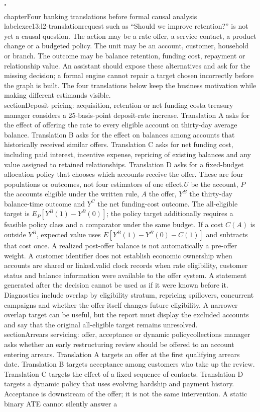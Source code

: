 "\\chapter{Four banking translations before formal causal analysis}\n\\label{exec13:l2-translation}\n\nA request such as “Should we improve retention?” is not yet a causal question. The action may be a rate offer, a service contact, a product change or a budgeted policy. The unit may be an account, customer, household or branch. The outcome may be balance retention, funding cost, repayment or relationship value. An assistant should expose these alternatives and ask for the missing decision; a formal engine cannot repair a target chosen incorrectly before the graph is built. The four translations below keep the business motivation while making different estimands visible.\n\n\\section{Deposit pricing: acquisition, retention or net funding cost}\n\nSuppose a treasury manager considers a 25-basis-point deposit-rate increase. Translation A asks for the effect of offering the rate to every eligible account on thirty-day average balance. Translation B asks for the effect on balances among accounts that historically received similar offers. Translation C asks for net funding cost, including paid interest, incentive expense, repricing of existing balances and any value assigned to retained relationships. Translation D asks for a fixed-budget allocation policy that chooses which accounts receive the offer. These are four populations or outcomes, not four estimators of one effect.\n\nLet $U$ be the account, $P$ the accounts eligible under the written rule, $A$ the offer, $Y^B$ the thirty-day balance-time outcome and $Y^C$ the net funding-cost outcome. The all-eligible target is $E_P[Y^B(1)-Y^B(0)]$; the policy target additionally requires a feasible policy class and a comparator under the same budget. If a cost $C(A)$ is outside $Y^B$, expected value uses $E[Y^B(1)-Y^B(0)-C(1)]$ and subtracts that cost once. A realized post-offer balance is not automatically a pre-offer weight. A customer identifier does not establish economic ownership when accounts are shared or linked.\n\nA valid clock records when rate eligibility, customer status and balance information were available to the offer system. A statement generated after the decision cannot be used as if it were known before it. Diagnostics include overlap by eligibility stratum, repricing spillovers, concurrent campaigns and whether the offer itself changes future eligibility. A narrower overlap target can be useful, but the report must display the excluded accounts and say that the original all-eligible target remains unresolved.\n\n\\section{Arrears servicing: offer, acceptance or dynamic policy}\n\nA collections manager asks whether an early restructuring review should be offered to an account entering arrears. Translation A targets an offer at the first qualifying arrears date. Translation B targets acceptance among customers who take up the review. Translation C targets the effect of a fixed sequence of contacts. Translation D targets a dynamic policy that uses evolving hardship and payment history. Acceptance is downstream of the offer; it is not the same intervention. A static binary ATE cannot silently answer a 